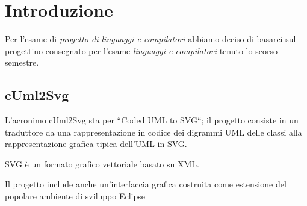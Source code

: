 \chapter{Introduzione}

Per l'esame di \emph{progetto di linguaggi e compilatori} abbiamo deciso di
basarci sul progettino consegnato per l'esame \emph{linguaggi e compilatori}
tenuto lo scorso semestre.



\section{cUml2Svg} 
L'acronimo cUml2Svg sta per ``Coded UML to SVG``; 
il progetto consiste in un traduttore da una rappresentazione
in codice dei digrammi UML delle classi alla rappresentazione grafica
tipica dell'UML in SVG.

SVG è un formato grafico vettoriale basato su XML.

Il progetto include anche un'interfaccia grafica costruita come estensione del
popolare ambiente di sviluppo Eclipse~\cite{eclipse_website}

